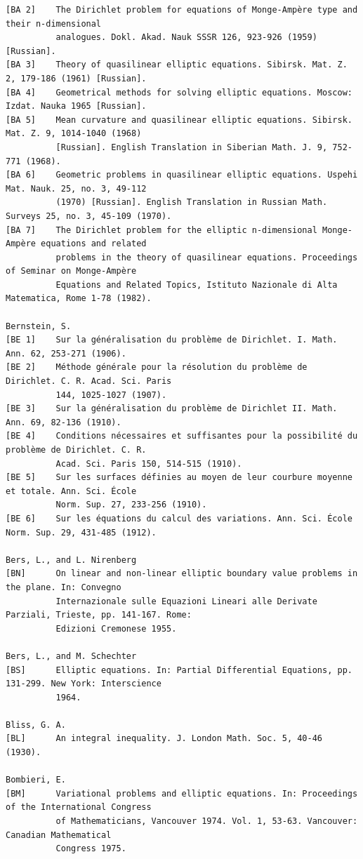 
\begin{verbatim}
[BA 2]    The Dirichlet problem for equations of Monge-Ampère type and their n-dimensional
          analogues. Dokl. Akad. Nauk SSSR 126, 923-926 (1959) [Russian].
[BA 3]    Theory of quasilinear elliptic equations. Sibirsk. Mat. Z. 2, 179-186 (1961) [Russian].
[BA 4]    Geometrical methods for solving elliptic equations. Moscow: Izdat. Nauka 1965 [Russian].
[BA 5]    Mean curvature and quasilinear elliptic equations. Sibirsk. Mat. Z. 9, 1014-1040 (1968)
          [Russian]. English Translation in Siberian Math. J. 9, 752-771 (1968).
[BA 6]    Geometric problems in quasilinear elliptic equations. Uspehi Mat. Nauk. 25, no. 3, 49-112
          (1970) [Russian]. English Translation in Russian Math. Surveys 25, no. 3, 45-109 (1970).
[BA 7]    The Dirichlet problem for the elliptic n-dimensional Monge-Ampère equations and related
          problems in the theory of quasilinear equations. Proceedings of Seminar on Monge-Ampère
          Equations and Related Topics, Istituto Nazionale di Alta Matematica, Rome 1-78 (1982).

Bernstein, S.
[BE 1]    Sur la généralisation du problème de Dirichlet. I. Math. Ann. 62, 253-271 (1906).
[BE 2]    Méthode générale pour la résolution du problème de Dirichlet. C. R. Acad. Sci. Paris
          144, 1025-1027 (1907).
[BE 3]    Sur la généralisation du problème de Dirichlet II. Math. Ann. 69, 82-136 (1910).
[BE 4]    Conditions nécessaires et suffisantes pour la possibilité du problème de Dirichlet. C. R.
          Acad. Sci. Paris 150, 514-515 (1910).
[BE 5]    Sur les surfaces définies au moyen de leur courbure moyenne et totale. Ann. Sci. École
          Norm. Sup. 27, 233-256 (1910).
[BE 6]    Sur les équations du calcul des variations. Ann. Sci. École Norm. Sup. 29, 431-485 (1912).

Bers, L., and L. Nirenberg
[BN]      On linear and non-linear elliptic boundary value problems in the plane. In: Convegno
          Internazionale sulle Equazioni Lineari alle Derivate Parziali, Trieste, pp. 141-167. Rome:
          Edizioni Cremonese 1955.

Bers, L., and M. Schechter
[BS]      Elliptic equations. In: Partial Differential Equations, pp. 131-299. New York: Interscience
          1964.

Bliss, G. A.
[BL]      An integral inequality. J. London Math. Soc. 5, 40-46 (1930).

Bombieri, E.
[BM]      Variational problems and elliptic equations. In: Proceedings of the International Congress
          of Mathematicians, Vancouver 1974. Vol. 1, 53-63. Vancouver: Canadian Mathematical
          Congress 1975.


\end{verbatim}
